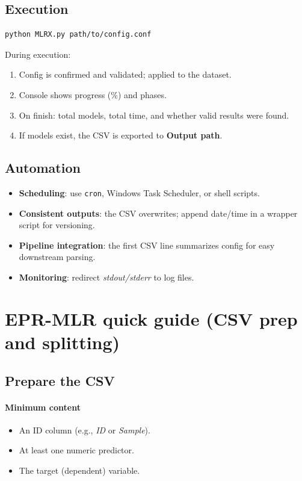 \documentclass[12pt,a4paper]{article}
\begin{document}
\subsection{Execution}
\begin{lstlisting}[style=mlrx]
python MLRX.py path/to/config.conf
\end{lstlisting}

During execution:
\begin{enumerate}
  \item Config is confirmed and validated; applied to the dataset.
  \item Console shows progress (\%) and phases.
  \item On finish: total models, total time, and whether valid results were found.
  \item If models exist, the CSV is exported to \textbf{Output path}.
\end{enumerate}

\subsection{Automation}
\begin{itemize}
  \item \textbf{Scheduling}: use \texttt{cron}, Windows Task Scheduler, or shell scripts.
  \item \textbf{Consistent outputs}: the CSV overwrites; append date/time in a wrapper script for versioning.
  \item \textbf{Pipeline integration}: the first CSV line summarizes config for easy downstream parsing.
  \item \textbf{Monitoring}: redirect \emph{stdout/stderr} to log files.
\end{itemize}

\section{EPR-MLR quick guide (CSV prep and splitting)}
\subsection{Prepare the CSV}
\paragraph{Minimum content}
\begin{itemize}
  \item An ID column (e.g., \emph{ID} or \emph{Sample}).
  \item At least one numeric predictor.
  \item The target (dependent) variable.
\end{itemize}
\end{document}

